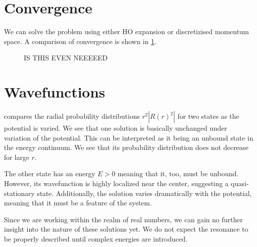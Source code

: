 \section{Convergence}
We can solve the problem using either HO expansion or discretizised momentum space. A comparison of convergence is shown in \cref{fig:HO vs mom}.
\begin{figure}
  \centering
  \caption{IS THIS EVEN NEEEEED}
  \label{fig:HO vs mom}
\end{figure}

\section{Wavefunctions}

 compares the radial probability distributions $r^2|R(r)^2|$ for two states as the potential is varied.
 We see that one solution is basically unchanged under variation of the potential. 
This can be interpreted as it being an unbound state in the energy continuum. We see that its probability distribution does not decrease for large $r$.

The other state has an energy $E>0$ meaning that it, too, must be unbound. 
However, its wavefunction is highly localized near the center, suggesting a quasi-stationary state. 
Additionally, the solution varies dramatically with the potential, meaning that it must be a feature of the system. 

Since we are working within the realm of real numbers, we can gain no further insight into the nature of these solutions yet. We do not expect the resonance to be properly described until complex energies are introduced.



